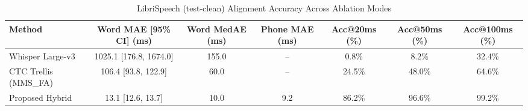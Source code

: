 \begin{table}[t]
\centering
\caption{LibriSpeech (test-clean) Alignment Accuracy Across Ablation Modes}
\label{tab:alignment_accuracy}
\begin{tabular}{lcccccc}
\toprule
Method & Word MAE [95\% CI] (ms) & Word MedAE (ms) & Phone MAE (ms) & Acc@20ms (\%) & Acc@50ms (\%) & Acc@100ms (\%) \\
\midrule
Whisper Large-v3 & 1025.1 [176.8, 1674.0] & 155.0 & -- & 0.8\% & 8.2\% & 32.4\% \\
CTC Trellis (MMS\_FA) & 106.4 [93.8, 122.9] & 60.0 & -- & 24.5\% & 48.0\% & 64.6\% \\
Proposed Hybrid & 13.1 [12.6, 13.7] & 10.0 & 9.2 & 86.2\% & 96.6\% & 99.2\% \\
\bottomrule
\end{tabular}
\end{table}
